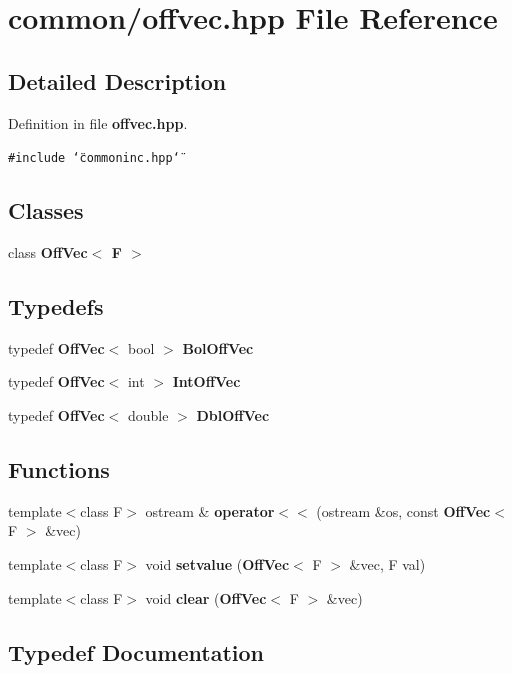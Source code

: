 \section{common/offvec.hpp File Reference}
\label{offvec_8hpp}


\subsection{Detailed Description}


Definition in file {\bf offvec.hpp}.

{\tt \#include \char`\"{}commoninc.hpp\char`\"{}}\par
\subsection*{Classes}
\begin{CompactItemize}
\item 
class {\bf Off\-Vec$<$ F $>$}
\end{CompactItemize}
\subsection*{Typedefs}
\begin{CompactItemize}
\item 
typedef {\bf Off\-Vec}$<$ bool $>$ {\bf Bol\-Off\-Vec}
\item 
typedef {\bf Off\-Vec}$<$ int $>$ {\bf Int\-Off\-Vec}
\item 
typedef {\bf Off\-Vec}$<$ double $>$ {\bf Dbl\-Off\-Vec}
\end{CompactItemize}
\subsection*{Functions}
\begin{CompactItemize}
\item 
template$<$class F$>$ ostream \& {\bf operator$<$$<$} (ostream \&os, const {\bf Off\-Vec}$<$ F $>$ \&vec)
\item 
template$<$class F$>$ void {\bf setvalue} ({\bf Off\-Vec}$<$ F $>$ \&vec, F val)
\item 
template$<$class F$>$ void {\bf clear} ({\bf Off\-Vec}$<$ F $>$ \&vec)
\end{CompactItemize}


\subsection{Typedef Documentation}
